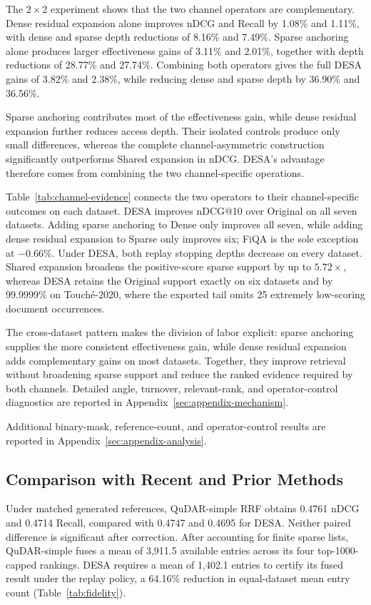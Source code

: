 The $2\times2$ experiment shows that the two channel operators are
complementary. Dense residual expansion alone improves nDCG and Recall by
1.08\% and 1.11\%, with dense and sparse depth reductions of 8.16\% and 7.49\%.
Sparse anchoring alone produces larger effectiveness gains of 3.11\% and 2.01\%,
together with depth reductions of 28.77\% and 27.74\%. Combining both operators
gives the full DESA gains of 3.82\% and 2.38\%, while reducing dense and sparse
depth by 36.90\% and 36.56\%.

Sparse anchoring contributes most of the effectiveness gain, while dense residual
expansion further reduces access depth. Their isolated controls produce only
small differences, whereas the complete channel-asymmetric construction
significantly outperforms Shared expansion in nDCG. DESA's advantage therefore
comes from combining the two channel-specific operations.

Table~\ref{tab:channel-evidence} connects the two operators to their
channel-specific outcomes on each dataset. DESA improves nDCG@10 over Original
on all seven datasets. Adding sparse anchoring to Dense only improves all seven,
while adding dense residual expansion to Sparse only improves six; FiQA is the
sole exception at $-0.66\%$. Under DESA, both replay stopping depths decrease on every
dataset. Shared expansion broadens the positive-score sparse support by up to
$5.72\times$, whereas DESA retains the Original support exactly on six datasets
and by 99.9999\% on Touch\'e-2020, where the exported tail omits 25 extremely
low-scoring document occurrences.

The cross-dataset pattern makes the division of labor explicit: sparse
anchoring supplies the more consistent effectiveness gain, while dense
residual expansion adds complementary gains on most datasets. Together, they
improve retrieval without broadening sparse support and reduce the ranked
evidence required by both channels. Detailed angle, turnover, relevant-rank,
and operator-control diagnostics are reported in
Appendix~\ref{sec:appendix-mechanism}.

Additional binary-mask, reference-count, and operator-control results are
reported in Appendix~\ref{sec:appendix-analysis}.

\subsection{Comparison with Recent and Prior Methods}

Under matched generated references, QuDAR-simple RRF obtains 0.4761 nDCG and
0.4714 Recall, compared with 0.4747 and 0.4695 for DESA. Neither paired difference
is significant after correction. After accounting for finite sparse lists,
QuDAR-simple fuses a mean of 3,911.5 available entries across its four
top-1000-capped rankings. DESA requires a mean of 1,402.1 entries to certify its
fused result under the replay policy, a 64.16\% reduction in equal-dataset mean
entry count (Table~\ref{tab:fidelity}).

